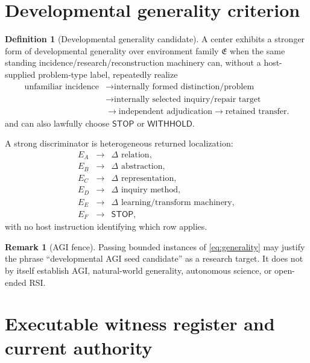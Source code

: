 \documentclass[10pt]{article}
\theoremstyle{venus}
\theoremstyle{definition}
\newtheorem{definition}[theorem]{Definition}
\newtheorem{remark}[theorem]{Remark}
\newcommand{\Withhold}{\mathsf{WITHHOLD}}
\newcommand{\Stop}{\mathsf{STOP}}
\begin{document}
\section{Developmental generality criterion}

\begin{definition}[Developmental generality candidate]
A center exhibits a stronger form of developmental generality over environment
family $\mathfrak E$ when the same standing incidence/research/reconstruction
machinery can, without a host-supplied problem-type label, repeatedly realize
\begin{equation}\label{eq:generality}
\begin{aligned}
\text{unfamiliar incidence}
&\to\text{internally formed distinction/problem}\\
&\to\text{internally selected inquiry/repair target}\\
&\to\text{independent adjudication}
\to\text{retained transfer}.
\end{aligned}
\end{equation}
and can also lawfully choose $\Stop$ or $\Withhold$.
\end{definition}

A strong discriminator is heterogeneous returned localization:
\[
\begin{array}{ccl}
E_A&\to&\Delta\text{ relation},\\
E_B&\to&\Delta\text{ abstraction},\\
E_C&\to&\Delta\text{ representation},\\
E_D&\to&\Delta\text{ inquiry method},\\
E_E&\to&\Delta\text{ learning/transform machinery},\\
E_F&\to&\Stop,
\end{array}
\]
with no host instruction identifying which row applies.

\begin{remark}[AGI fence]
Passing bounded instances of \eqref{eq:generality} may justify the phrase
``developmental AGI seed candidate'' as a research target. It does not by itself
establish AGI, natural-world generality, autonomous science, or open-ended RSI.
\end{remark}

\section{Executable witness register and current authority}
\end{document}
